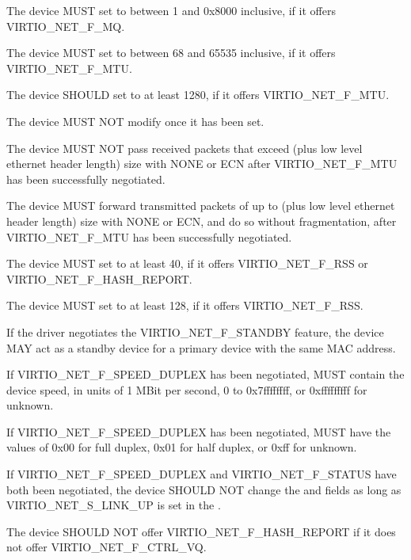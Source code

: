 
The device MUST set  to between 1 and 0x8000 inclusive,
if it offers VIRTIO_NET_F_MQ.

The device MUST set  to between 68 and 65535 inclusive,
if it offers VIRTIO_NET_F_MTU.

The device SHOULD set  to at least 1280, if it offers
VIRTIO_NET_F_MTU.

The device MUST NOT modify  once it has been set.

The device MUST NOT pass received packets that exceed  (plus low
level ethernet header length) size with  NONE or ECN
after VIRTIO_NET_F_MTU has been successfully negotiated.

The device MUST forward transmitted packets of up to  (plus low
level ethernet header length) size with  NONE or ECN, and do
so without fragmentation, after VIRTIO_NET_F_MTU has been successfully
negotiated.

The device MUST set  to at least 40, if it offers
VIRTIO_NET_F_RSS or VIRTIO_NET_F_HASH_REPORT.

The device MUST set  to at least 128, if it offers
VIRTIO_NET_F_RSS.

If the driver negotiates the VIRTIO_NET_F_STANDBY feature, the device MAY act
as a standby device for a primary device with the same MAC address.

If VIRTIO_NET_F_SPEED_DUPLEX has been negotiated, 
MUST contain the device speed, in units of 1 MBit per second, 0 to
0x7ffffffff, or 0xfffffffff for unknown.

If VIRTIO_NET_F_SPEED_DUPLEX has been negotiated, 
MUST have the values of 0x00 for full duplex, 0x01 for half
duplex, or 0xff for unknown.

If VIRTIO_NET_F_SPEED_DUPLEX and VIRTIO_NET_F_STATUS have both
been negotiated, the device SHOULD NOT change the  and
 fields as long as VIRTIO_NET_S_LINK_UP is set in
the .

The device SHOULD NOT offer VIRTIO_NET_F_HASH_REPORT if it
does not offer VIRTIO_NET_F_CTRL_VQ.

